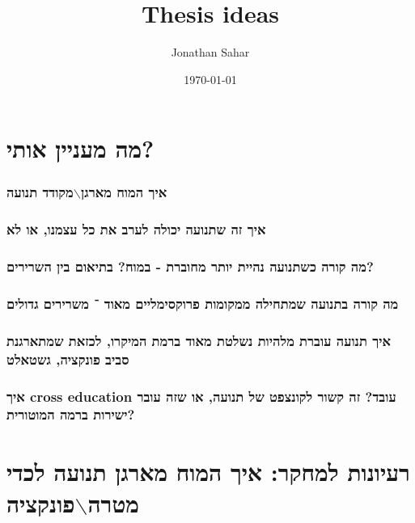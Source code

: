 \documentclass[11pt]{article}
\author{Jonathan Sahar}
\date{\today}
\title{Thesis ideas}
\begin{document}
\maketitle
\section{מה מעניין אותי?}
\label{sec:orgc00e8ee}
\subsubsection{איך המוח מארגן$\backslash$מקודד תנועה}
\label{sec:org4213f4f}
\subsubsection{איך זה שתנועה יכולה לערב את כל עצמנו, או לא}
\label{sec:org1d60e87}
\subsubsection{מה קורה כשתנועה נהיית יותר מחוברת - במוח? בתיאום בין השרירים?}
\label{sec:org4bd0432}
\subsubsection{מה קורה בתנועה שמתחילה ממקומות פרוקסימליים מאוד ־ משרירים גדולים}
\label{sec:org2333d0f}
\subsubsection{איך תנועה עוברת מלהיות נשלטת מאוד ברמת המיקרו, לכזאת שמתארגנת סביב פונקציה, גשטאלט}
\label{sec:org6d0aa17}
\subsubsection{איך cross education עובד? זה קשור לקונצפט של תנועה, או שזה עובר ישירות ברמה המוטורית?}
\label{sec:org1aa25f9}

\section{רעיונות למחקר: איך המוח מארגן תנועה לכדי מטרה$\backslash$פונקציה}
\label{sec:org8e15b9a}
\end{document}
